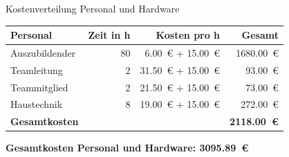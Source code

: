 \documentclass[10pt,ngerman]{beamer}
\begin{document}
\begin{frame}[fragile]{Kostenverteilung Personal und Hardware}
  \begin{table}[htbp]
    \centering
    \begin{tabular}{lrrr}
      \textbf{Personal}     & \textbf{Zeit in h} & \textbf{Kosten pro h}          & \textbf{Gesamt}          \\ \hline
      Auszubildender        & 80                 & \SI{6.00}{€} + \SI{15.00}{€}   & \SI{1680.00}{€}          \\
      Teamleitung           & 2                  & \SI{31.50}{€}  + \SI{15.00}{€} & \SI{93.00}{€}            \\
      Teammitglied          & 2                  & \SI{21.50}{€}  + \SI{15.00}{€} & \SI{73.00}{€}            \\
      Haustechnik           & 8                  & \SI{19.00}{€}  + \SI{15.00}{€} & \SI{272.00}{€}           \\ \hline
      \textbf{Gesamtkosten} &                    &                                & \textbf{\SI{2118.00}{€}}
    \end{tabular}
  \end{table}

  \vspace{0.4cm}

  \textbf{Gesamtkosten Personal und Hardware: \SI{3095.89}{€}}
\end{frame}

\end{document}
